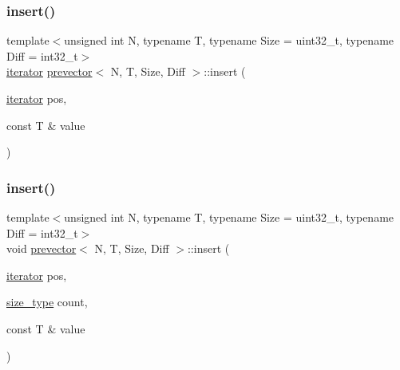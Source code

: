 \subsubsection{\texorpdfstring{insert()}{insert()}\hspace{0.1cm}{\footnotesize\ttfamily [1/3]}}
{\footnotesize\ttfamily template$<$unsigned int N, typename T, typename Size = uint32\+\_\+t, typename Diff = int32\+\_\+t$>$ \\
\mbox{\hyperlink{classprevector_1_1iterator}{iterator}} \mbox{\hyperlink{classprevector}{prevector}}$<$ N, T, Size, Diff $>$\+::insert (\begin{DoxyParamCaption}\item[{\mbox{\hyperlink{classprevector_1_1iterator}{iterator}}}]{pos,  }\item[{const T \&}]{value }\end{DoxyParamCaption})\hspace{0.3cm}{\ttfamily [inline]}}

\mbox{\label{classprevector_aede9f795653c38dc88bb5fabd80f7b6f}} 
\subsubsection{\texorpdfstring{insert()}{insert()}\hspace{0.1cm}{\footnotesize\ttfamily [2/3]}}
{\footnotesize\ttfamily template$<$unsigned int N, typename T, typename Size = uint32\+\_\+t, typename Diff = int32\+\_\+t$>$ \\
void \mbox{\hyperlink{classprevector}{prevector}}$<$ N, T, Size, Diff $>$\+::insert (\begin{DoxyParamCaption}\item[{\mbox{\hyperlink{classprevector_1_1iterator}{iterator}}}]{pos,  }\item[{\mbox{\hyperlink{classprevector_a7e0da95e6d1c878f6eeb572f4fc12524}{size\+\_\+type}}}]{count,  }\item[{const T \&}]{value }\end{DoxyParamCaption})\hspace{0.3cm}{\ttfamily [inline]}}

\mbox{\label{classprevector_aa14cdf5ea4f9f9b5256bca10e49e682c}} 
